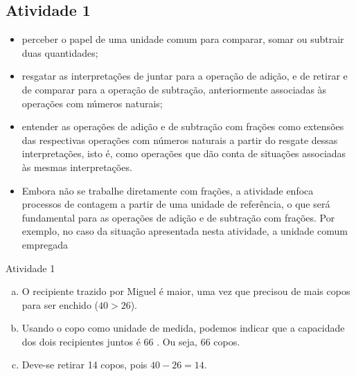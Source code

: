   \begin{multicols}{2}

\subsection{Atividade 1}

\vspace{.15cm}

\begin{itemize} %
  \item     perceber o papel de uma unidade comum para comparar, somar ou subtrair duas quantidades;
  \item     resgatar as interpretações de juntar para a operação de adição, e de retirar e de comparar para a operação de subtração, anteriormente associadas às operações com números naturais;
  \item     entender as operações de adição e de subtração com frações como extensões das respectivas operações com números naturais a partir do resgate dessas interpretações, isto é, como operações que dão conta de situações associadas às mesmas interpretações.
\end{itemize} %


 \vspace{.15cm}
\begin{itemize} %
  \item     Embora não se trabalhe diretamente com frações, a atividade enfoca processos de contagem a partir de uma unidade de referência, o que será fundamental para as operações de adição e de subtração com frações. Por exemplo, no caso da situação apresentada nesta atividade, a unidade comum empregada 
\end{itemize} %

\begin{resposta*}{Atividade 1}
 \begin{enumerate}[a)]
  \item O recipiente trazido por Miguel é maior, uma vez que precisou de mais copos para ser enchido ($40>26$). 
  \item Usando o copo como unidade de medida, podemos indicar que a capacidade dos dois recipientes juntos é 66 . Ou seja, 66 copos. 
  \item Deve-se retirar 14 copos, pois $40 - 26=14$.
 \end{enumerate}


\end{resposta*}
\end{multicols}
